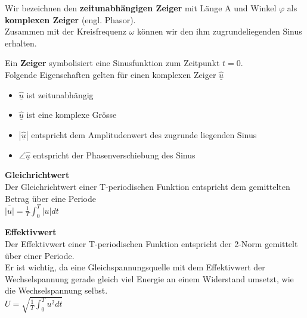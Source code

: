 Wir bezeichnen den \textbf{zeitunabhängigen Zeiger} mit Länge A und Winkel $\varphi$ als \textbf{komplexen Zeiger} (engl. Phasor). \\
Zusammen mit der Kreisfrequenz $\omega$ können wir den ihm zugrundeliegenden Sinus erhalten. \\


\beginip
Ein \textbf{Zeiger} symbolisiert eine Sinusfunktion zum Zeitpunkt $t = 0$. \\
Folgende Eigenschaften gelten für einen komplexen Zeiger $\underline{\hat{u}}$
\begin{itemize}
\item $\underline{\hat{u}}$ ist zeitunabhängig
\item $\underline{\hat{u}}$ ist eine komplexe Grösse
\item $|\underline{\hat{u}}|$ entspricht dem Amplitudenwert des zugrunde liegenden Sinus
\item $ \angle \underline{\hat{u}}$ entspricht der Phasenverschiebung des Sinus
\end{itemize}

\iend

\newpage

\beginip
\textbf{Gleichrichtwert}  \\
Der Gleichrichtwert einer T-periodischen Funktion entspricht dem gemittelten Betrag über eine Periode \\
\formulaBegin
$\displaystyle \overline{|u|} = \frac{1}{T} \int_0^T |u| dt $
\formulaEnd



\textbf{Effektivwert}  \\
Der Effektivwert einer T-periodischen Funktion entspricht der 2-Norm gemittelt über einer Periode. \\
Er ist wichtig, da eine Gleichspannungsquelle mit dem Effektivwert der Wechselspannung gerade gleich viel Energie an einem Widerstand umsetzt, wie die Wechselspannung selbst. \\
\formulaBegin
$ \displaystyle  U = \sqrt{\frac{1}{T} \int_0^T u^2 dt} $
\formulaEnd
\iend

